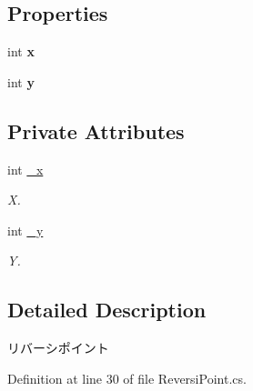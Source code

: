 \subsection*{Properties}
\begin{DoxyCompactItemize}
\item 
\mbox{\label{class_reversi_form_1_1_reversi_point_abc4fee511479385239948b1c037b2af0}} 
int {\bfseries x}
\item 
\mbox{\label{class_reversi_form_1_1_reversi_point_a8e90c52c3b06775a7ad689b2520073cb}} 
int {\bfseries y}
\end{DoxyCompactItemize}
\subsection*{Private Attributes}
\begin{DoxyCompactItemize}
\item 
\mbox{\label{class_reversi_form_1_1_reversi_point_a89bfb48eb8d45980af7a2b0dcdefcae4}} 
int \hyperlink{class_reversi_form_1_1_reversi_point_a89bfb48eb8d45980af7a2b0dcdefcae4}{\+\_\+x}
\begin{DoxyCompactList}\small\item\em X. \end{DoxyCompactList}\item 
\mbox{\label{class_reversi_form_1_1_reversi_point_ad1b501d3a1ed8946d5229f8cb39df2fa}} 
int \hyperlink{class_reversi_form_1_1_reversi_point_ad1b501d3a1ed8946d5229f8cb39df2fa}{\+\_\+y}
\begin{DoxyCompactList}\small\item\em Y. \end{DoxyCompactList}\end{DoxyCompactItemize}


\subsection{Detailed Description}
リバーシポイント 

Definition at line 30 of file Reversi\+Point.\+cs.




